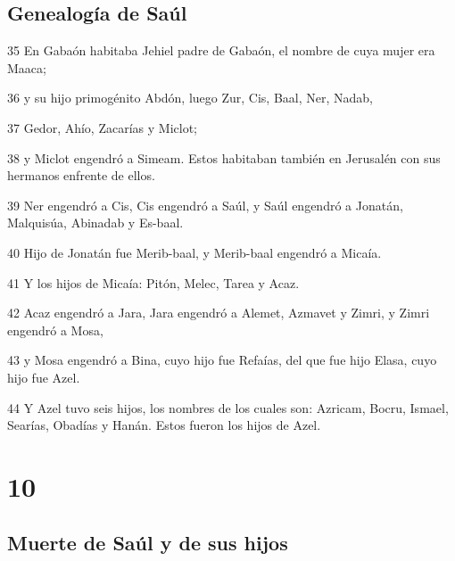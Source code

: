 \section*{Genealogía de Saúl}

\par 35 En Gabaón habitaba Jehiel padre de Gabaón, el nombre de cuya mujer era Maaca;
\par 36 y su hijo primogénito Abdón, luego Zur, Cis, Baal, Ner, Nadab,
\par 37 Gedor, Ahío, Zacarías y Miclot;
\par 38 y Miclot engendró a Simeam. Estos habitaban también en Jerusalén con sus hermanos enfrente de ellos.
\par 39 Ner engendró a Cis, Cis engendró a Saúl, y Saúl engendró a Jonatán, Malquisúa, Abinadab y Es-baal.
\par 40 Hijo de Jonatán fue Merib-baal, y Merib-baal engendró a Micaía.
\par 41 Y los hijos de Micaía: Pitón, Melec, Tarea y Acaz.
\par 42 Acaz engendró a Jara, Jara engendró a Alemet, Azmavet y Zimri, y Zimri engendró a Mosa,
\par 43 y Mosa engendró a Bina, cuyo hijo fue Refaías, del que fue hijo Elasa, cuyo hijo fue Azel.
\par 44 Y Azel tuvo seis hijos, los nombres de los cuales son: Azricam, Bocru, Ismael, Searías, Obadías y Hanán. Estos fueron los hijos de Azel.

\chapter{10}

\section*{Muerte de Saúl y de sus hijos}

